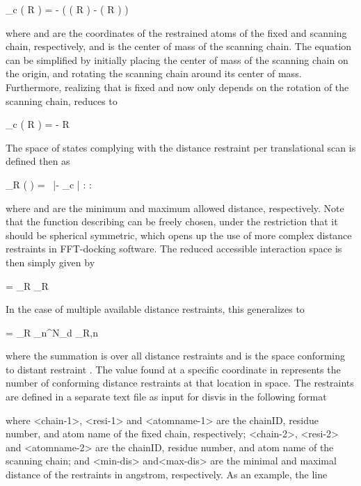 \startformula
\rvec_c \left( R \right) = \rvecF - \left( \rvecS \left( R \right) - \rveccomS \left( R \right) \right)
\stopformula

where \m{\rvecF} and \m{\rvecS} are the coordinates of the restrained atoms of
the fixed and scanning chain, respectively, and \m{\rveccomS} is the center of
mass of the scanning chain. The equation can be simplified by initially placing
the center of mass of the scanning chain on the origin, and rotating the
scanning chain around its center of mass. Furthermore, realizing that
\m{\rvecF} is fixed and \m{\rvecS} now only depends on the rotation of the
scanning chain,  reduces to

\startformula
\rvec_c \left( R \right) = \rvecF - R \rvecS
\stopformula

The space of states complying with the distance restraint per translational
scan  is defined then as

\startformula
\boldL_R \left( \rvec \right) = \startmathcases
\NC {}\ \dmin \leq |\rvec - \rvec_c | \leq \dmax:  \NR
\NC \NC \NR
\NC {}: \NR
\stopmathcases
\stopformula

where \m{\dmin} and \m{\dmax} are the minimum and maximum allowed distance,
respectively.  Note that the function describing  can be freely
chosen, under the restriction that it should be spherical symmetric, which
opens up the use of more complex distance restraints in FFT-docking software.
The reduced accessible interaction space \m{\redais} is then simply given by

\startformula
\redais = \boldA_R \times \boldL_R
\stopformula

In the case of multiple available distance restraints, this generalizes to

\startformula
\redais = \boldA_R \times \sum_n^{N_d} \boldL_{R,n}
\stopformula

where the summation is over all distance restraints  and
 is the space conforming to distant restraint . The value
found at a specific coordinate in \m{\redais} represents the number of
conforming distance restraints at that location in space. The restraints are
defined in a separate text file as input for disvis in the following format


where <chain-1>, <resi-1> and <atomname-1> are the chainID, residue number, and
atom name of the fixed chain, respectively; <chain-2>, <resi-2> and
<atomname-2> are the chainID, residue number, and atom name of the scanning
chain; and <min-dis> and<max-dis> are the minimal and maximal distance of the
restraints in angstrom, respectively. As an example, the line

